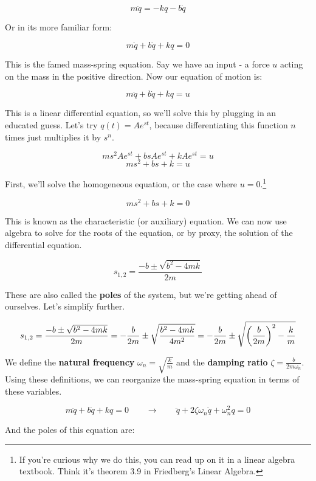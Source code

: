 \documentclass{report}
\begin{document}
\begin{onehalfspacing}
\begin{flushleft}
\vspace{-0.1in}
\[m\ddot{q} = -kq - b\dot{q}\]

Or in its more familiar form:

\vspace{-0.1in}
\[m\ddot{q} + b\dot{q} + kq = 0\]

This is the famed mass-spring equation. Say we have an input - a force \(u\) acting on the mass in the positive direction. Now our equation of motion is:

\vspace{-0.1in}
\[m\ddot{q} + b\dot{q} + kq = u\]

This is a linear differential equation, so we'll solve this by plugging in an educated guess. Let's try \(q(t) = Ae^{st}\), because differentiating this function \(n\) times just multiplies it by \(s^n\).

\vspace{-0.1in}
\[ms^2 Ae^{st} + bs Ae^{st} + kAe^{st} = u\]
\[ms^2 + bs + k = u\]

First, we'll solve the homogeneous equation, or the case where \(u=0\).\footnote{If you're curious why we do this, you can read up on it in a linear algebra textbook. Think it's theorem 3.9 in Friedberg's Linear Algebra.}

\[ms^2 + bs + k = 0\]

This is known as the characteristic (or auxiliary) equation. We can now use algebra to solve for the roots of the equation, or by proxy, the solution of the differential equation.

\[s_{1, 2} = \frac{-b \pm \sqrt{b^2 - 4mk}}{2m}\]

These are also called the \textbf{poles} of the system, but we're getting ahead of ourselves. Let's simplify further.

\[s_{1, 2} = \frac{-b \pm \sqrt{b^2 - 4mk}}{2m} = -\frac{b}{2m} \pm \sqrt{\frac{b^2 - 4mk}{4m^2}} = -\frac{b}{2m} \pm \sqrt{\qty(\frac{b}{2m})^2 - \frac{k}{m}}\]

We define the \textbf{natural frequency} \(\omega_n = \sqrt{\frac{k}{m}}\) and the \textbf{damping ratio} \(\zeta = \frac{b}{2m\omega_n}\). Using these definitions, we can reorganize the mass-spring equation in terms of these variables.

\vspace{-0.1in}
\[m\ddot{q} + b\dot{q} + kq = 0 \qquad \to \qquad \ddot{q} + 2\zeta\omega_n \dot{q} + \omega_n^2 q = 0\]

And the poles of this equation are:


\end{flushleft}
\end{onehalfspacing}
\end{document}
